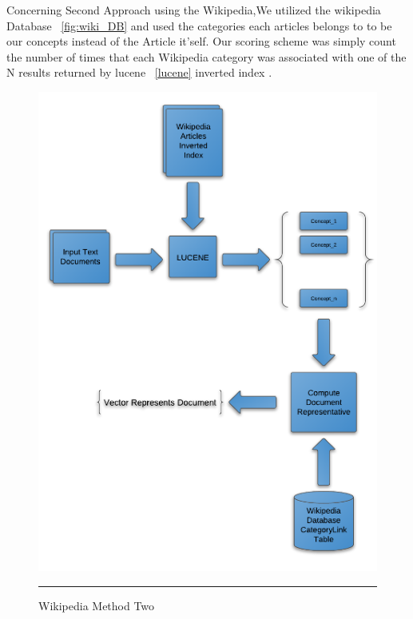 Concerning Second Approach using the Wikipedia,We utilized the wikipedia Database ~\ref{fig:wiki_DB} and used the categories each articles belongs to to be our concepts instead of the Article it'self. Our scoring scheme was simply count the number of times that each Wikipedia category was associated with one of the N results returned by lucene ~\ref{lucene} inverted index \citep{wiki_2}.
\begin{figure}[htbp]
	\centering
		\includegraphics{./Figures/wiki_2.png}
		\rule{35em}{0.05pt}
	\caption[Wikipedia Method Two]{Wikipedia Method Two}
	\label{fig:Method Two}
\end{figure}
